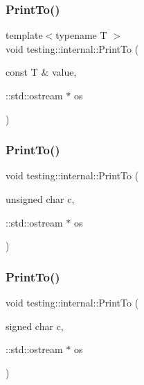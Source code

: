 \mbox{\label{namespacetesting_1_1internal_adb3c27150dbe661db0e0c4be27533460}} 
\subsubsection{\texorpdfstring{PrintTo()}{PrintTo()}\hspace{0.1cm}{\footnotesize\ttfamily [4/23]}}
{\footnotesize\ttfamily template$<$typename T $>$ \\
void testing\+::internal\+::\+Print\+To (\begin{DoxyParamCaption}\item[{const T \&}]{value,  }\item[{\+::std\+::ostream $\ast$}]{os }\end{DoxyParamCaption})}

\mbox{\label{namespacetesting_1_1internal_ab7524d6d3ab8c31b1deea88bf61783bb}} 
\subsubsection{\texorpdfstring{PrintTo()}{PrintTo()}\hspace{0.1cm}{\footnotesize\ttfamily [5/23]}}
{\footnotesize\ttfamily void testing\+::internal\+::\+Print\+To (\begin{DoxyParamCaption}\item[{unsigned char}]{c,  }\item[{\+::std\+::ostream $\ast$}]{os }\end{DoxyParamCaption})}

\mbox{\label{namespacetesting_1_1internal_ad453af399370e394881079c243abacb4}} 
\subsubsection{\texorpdfstring{PrintTo()}{PrintTo()}\hspace{0.1cm}{\footnotesize\ttfamily [6/23]}}
{\footnotesize\ttfamily void testing\+::internal\+::\+Print\+To (\begin{DoxyParamCaption}\item[{signed char}]{c,  }\item[{\+::std\+::ostream $\ast$}]{os }\end{DoxyParamCaption})}

